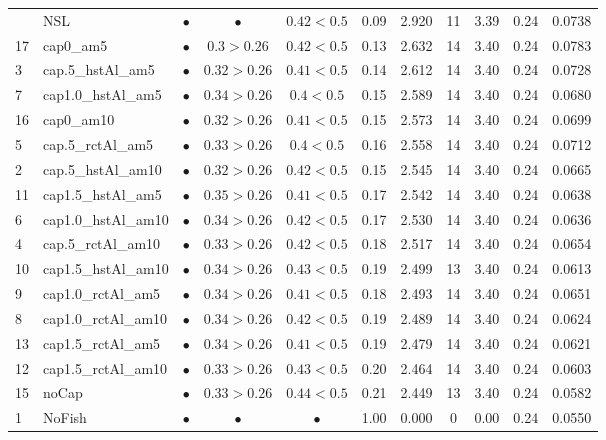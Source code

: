 \documentclass[11pt]{book}
\begin{document}
\begin{landscape}
\begin{longtable}[t]{llccccccccc}
\midrule
\endhead
\
\endfoot
\bottomrule
\endlastfoot
14 & NSL & $\bullet$ & $\bullet$ & $0.42<0.5$ & 0.09 & 2.920 & 11 & 3.39 & 0.24 & 0.0738\\
17 & cap0\_am5 & $\bullet$ & $0.3>0.26$ & $0.42<0.5$ & 0.13 & 2.632 & 14 & 3.40 & 0.24 & 0.0783\\
3 & cap.5\_hstAl\_am5 & $\bullet$ & $0.32>0.26$ & $0.41<0.5$ & 0.14 & 2.612 & 14 & 3.40 & 0.24 & 0.0728\\
7 & cap1.0\_hstAl\_am5 & $\bullet$ & $0.34>0.26$ & $0.4<0.5$ & 0.15 & 2.589 & 14 & 3.40 & 0.24 & 0.0680\\
16 & cap0\_am10 & $\bullet$ & $0.32>0.26$ & $0.41<0.5$ & 0.15 & 2.573 & 14 & 3.40 & 0.24 & 0.0699\\
5 & cap.5\_rctAl\_am5 & $\bullet$ & $0.33>0.26$ & $0.4<0.5$ & 0.16 & 2.558 & 14 & 3.40 & 0.24 & 0.0712\\
2 & cap.5\_hstAl\_am10 & $\bullet$ & $0.32>0.26$ & $0.42<0.5$ & 0.15 & 2.545 & 14 & 3.40 & 0.24 & 0.0665\\
11 & cap1.5\_hstAl\_am5 & $\bullet$ & $0.35>0.26$ & $0.41<0.5$ & 0.17 & 2.542 & 14 & 3.40 & 0.24 & 0.0638\\
6 & cap1.0\_hstAl\_am10 & $\bullet$ & $0.34>0.26$ & $0.42<0.5$ & 0.17 & 2.530 & 14 & 3.40 & 0.24 & 0.0636\\
4 & cap.5\_rctAl\_am10 & $\bullet$ & $0.33>0.26$ & $0.42<0.5$ & 0.18 & 2.517 & 14 & 3.40 & 0.24 & 0.0654\\
10 & cap1.5\_hstAl\_am10 & $\bullet$ & $0.34>0.26$ & $0.43<0.5$ & 0.19 & 2.499 & 13 & 3.40 & 0.24 & 0.0613\\
9 & cap1.0\_rctAl\_am5 & $\bullet$ & $0.34>0.26$ & $0.41<0.5$ & 0.18 & 2.493 & 14 & 3.40 & 0.24 & 0.0651\\
8 & cap1.0\_rctAl\_am10 & $\bullet$ & $0.34>0.26$ & $0.42<0.5$ & 0.19 & 2.489 & 14 & 3.40 & 0.24 & 0.0624\\
13 & cap1.5\_rctAl\_am5 & $\bullet$ & $0.34>0.26$ & $0.41<0.5$ & 0.19 & 2.479 & 14 & 3.40 & 0.24 & 0.0621\\
12 & cap1.5\_rctAl\_am10 & $\bullet$ & $0.33>0.26$ & $0.43<0.5$ & 0.20 & 2.464 & 14 & 3.40 & 0.24 & 0.0603\\
15 & noCap & $\bullet$ & $0.33>0.26$ & $0.44<0.5$ & 0.21 & 2.449 & 13 & 3.40 & 0.24 & 0.0582\\
1 & NoFish & $\bullet$ & $\bullet$ & $\bullet$ & 1.00 & 0.000 & 0 & 0.00 & 0.24 & 0.0550\\*
\end{longtable}
\end{landscape}
\endgroup{}
\end{document}
